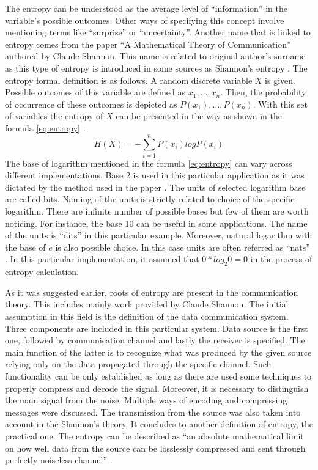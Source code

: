The entropy can be understood as the average level of ``information'' in the variable's possible outcomes. Other ways of
specifying this concept involve mentioning terms like ``surprise'' or ``uncertainty''. Another name that is linked to entropy comes from the paper
``A Mathematical Theory of Communication'' authored by Claude Shannon. This name is related to original author's surname as
this type of entropy is introduced in some sources as Shannon's entropy \cite{entropy_wiki}. The entropy formal
definition is as follows. A random discrete variable $X$ is given. Possible outcomes of this variable are defined as
$x_{1},\dots,x_{n}$. Then, the probability of occurrence of these outcomes is depicted as $P(x_{1}),\dots,P(x_{n})$.
With this set of variables the entropy of $X$ can be presented in the way as shown in the formula \ref{eq:entropy} \cite{entropy}.
\begin{equation}
    H(X)=-\sum_{i=1}^{n}P(x_{i})logP(x_{i})
\label{eq:entropy}
\end{equation}
The base of logarithm mentioned in the formula \ref{eq:entropy} can vary across different implementations. Base 2 is used
in this particular application as it was dictated by the method used in the paper \cite{entropy}.
The units of selected logarithm base are called bits. Naming of the units is strictly related to choice of the specific logarithm.
There are infinite number of possible bases but few of them are worth noticing. For instance, the base 10 can be useful in some
applications. The name of the units is ``dits'' in this particular example. Moreover, natural logarithm with the base of $e$
is also possible choice. In this case units are often referred as ``nats'' \cite{entropy_wiki}.
In this particular implementation, it assumed that $0*log_{2}0=0$ in the process of entropy calculation.

As it was suggested earlier, roots of entropy are present in the communication theory. This includes mainly work
provided by Claude Shannon. The initial assumption in this field is the definition of the data communication system.
Three components are included in this particular system. Data source is the first one, followed by communication channel
and lastly the receiver is specified. The main function of the latter is to recognize what was produced by the given source
relying only on the data propagated through the specific channel. Such functionality can be only established as long as
there are used some techniques to properly compress and decode the signal. Moreover, it is necessary to distinguish
the main signal from the noise. Multiple ways of encoding and compressing messages were discussed. The transmission
from the source was also taken into account in the Shannon's theory. It concludes to another definition of entropy,
the practical one. The entropy can be described as  ``an absolute mathematical limit on how well data from the source
can be losslessly compressed and sent through perfectly noiseless channel'' \cite{entropy_wiki}. 

